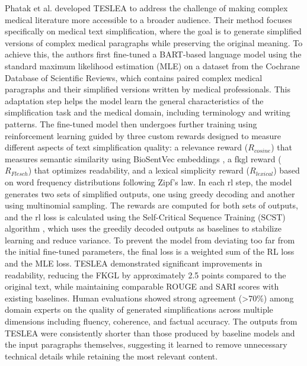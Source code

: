 Phatak et al. \cite{info:doi/10.2196/38095} developed TESLEA to address the challenge of making complex medical literature more accessible to a broader audience. 
Their method focuses specifically on medical text simplification, where the goal is to generate simplified versions of complex medical paragraphs while preserving the original meaning. 
To achieve this, the authors first fine-tuned a BART-based language model using the standard maximum likelihood estimation (MLE) on a dataset from the Cochrane Database of Scientific Reviews, which contains paired complex medical paragraphs and their simplified versions written by medical professionals.
This adaptation step helps the model learn the general characteristics of the simplification task and the medical domain, including terminology and writing patterns. 
The fine-tuned model then undergoes further training using reinforcement learning guided by three custom rewards designed to measure different aspects of text simplification quality: a relevance reward ($R_{cosine}$) that measures semantic similarity using BioSentVec embeddings \cite{Chen_2019}, a \gls{fkgl} reward ($R_{Flesch}$) that optimizes readability, and a lexical simplicity reward ($R_{lexical}$) based on word frequency distributions following Zipf's law. 
In each \gls{rl} step, the model generates two sets of simplified outputs, one using greedy decoding and another using multinomial sampling. 
The rewards are computed for both sets of outputs, and the \gls{rl} loss is calculated using the Self-Critical Sequence Training (SCST) algorithm \cite{8099614}, which uses the greedily decoded outputs as baselines to stabilize learning and reduce variance.
To prevent the model from deviating too far from the initial fine-tuned parameters, the final loss is a weighted sum of the RL loss and the MLE loss.
TESLEA demonstrated significant improvements in readability, reducing the FKGL by approximately 2.5 points compared to the original text, while maintaining comparable ROUGE and SARI scores with existing baselines. Human evaluations showed strong agreement (>70\%) among domain experts on the quality of generated simplifications across multiple dimensions including fluency, coherence, and factual accuracy.
The outputs from TESLEA were consistently shorter than those produced by baseline models and the input paragraphs themselves, suggesting it learned to remove unnecessary technical details while retaining the most relevant content.


